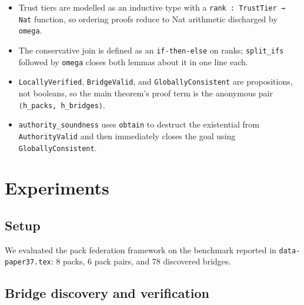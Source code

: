 \documentclass[11pt]{article}
\begin{document}
\begin{itemize}
  \item Trust tiers are modelled as an inductive type with a
    \texttt{rank : TrustTier → Nat} function, so ordering proofs reduce
    to Nat arithmetic discharged by \texttt{omega}.
  \item The conservative join is defined as an \texttt{if-then-else}
    on ranks; \texttt{split\_ifs} followed by \texttt{omega} closes
    both lemmas about it in one line each.
  \item \texttt{LocallyVerified}, \texttt{BridgeValid}, and
    \texttt{GloballyConsistent} are propositions, not booleans, so
    the main theorem's proof term is the anonymous pair
    \texttt{⟨h\_packs, h\_bridges⟩}.
  \item \texttt{authority\_soundness} uses \texttt{obtain} to
    destruct the existential from \texttt{AuthorityValid} and then
    immediately closes the goal using \texttt{GloballyConsistent}.
\end{itemize}

\section{Experiments}
\label{sec:experiments}

\subsection{Setup}

We evaluated the pack federation framework on the benchmark reported in
\texttt{data-paper37.tex}: 8 packs, 6 pack pairs, and 78 discovered
bridges.

\subsection{Bridge discovery and verification}
\end{document}
